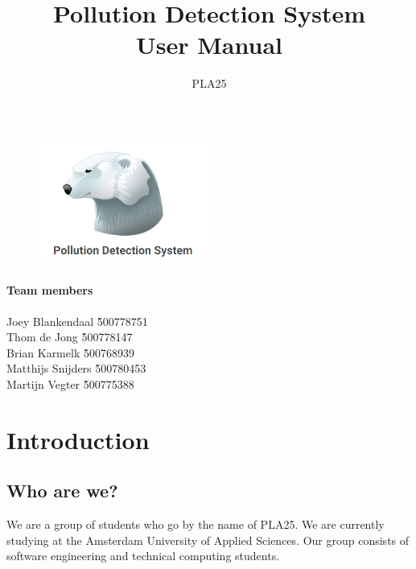 \documentclass[a4paper]{article}
\title{Pollution Detection System\\User Manual}
\author{PLA25}
\begin{document}
\maketitle
\vspace*{\fill}

\begin{figure}[htb]
  \centering
  \includegraphics[width=0.5\textwidth]{front-page}
\end{figure}


\paragraph{Team members}
\begin{tabbing}
	Joey Blankendaal 	\` 	500778751 	\\
	Thom de Jong 		\` 	500778147 	\\
	Brian Karmelk 		\` 	500768939 	\\
	Matthijs Snijders 	\` 	500780453 	\\
	Martijn Vegter 		\` 	500775388
\end{tabbing}

\thispagestyle{empty}
\newpage

\tableofcontents
\newpage

\section{Introduction}

\subsection{Who are we?}
We are a group of students who go by the name of PLA25. We are currently studying at the Amsterdam University of Applied Sciences. Our group consists of software engineering and technical computing students.
\end{document}
